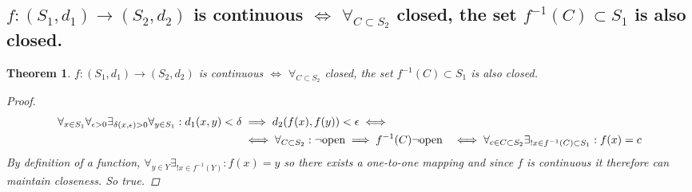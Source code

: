 \documentclass[]{article}
\newtheorem{theorem}{Theorem}
\begin{document}
\subsection{$f: (S_1,d_1) \to (S_2,d_2)$ is continuous $\iff$ $\forall_{C \subset S_2}$ closed, the set $f^{-1} (C) \subset S_1$ is also closed.}
\begin{theorem}
    $f: (S_1,d_1) \to (S_2,d_2)$ is continuous $\iff$ $\forall_{C \subset S_2}$ closed, the set $f^{-1} (C) \subset S_1$ is also closed.
    \begin{proof}
        \begin{align*}
            \forall_{x\in S_1} \forall_{\epsilon>0} \exists_{\delta(x,\epsilon)>0} \forall_{y\in S_1} : d_1(x,y) < \delta 
                &\implies d_2(f(x),f(y)) < \epsilon \iff\\
                &\iff \forall_{C\subset S_2} : \lnot \textnormal{open} \implies f^{-1}(C) \lnot \textnormal{open}
                &\iff \forall_{c \in C \subset S_2} \exists_{! x \in f^{-1}(C) \subset S_1} : f(x) = c
        \end{align*}
        By definition of a function, $\forall_{y \in Y} \exists_{! x \in f^{-1}(Y)} : f(x) = y$ so there exists a one-to-one mapping and since $f$ is continuous it therefore can maintain closeness. So true.
    \end{proof}
\end{theorem}

\end{document}
